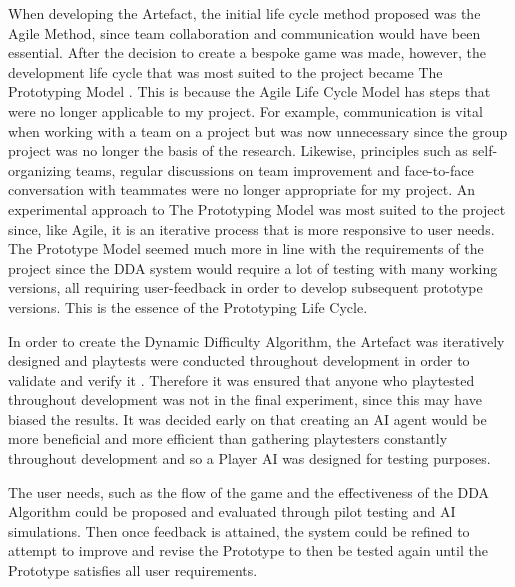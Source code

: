 \documentclass[journal]{IEEEtran}
\begin{document}
When developing the Artefact, the initial life cycle method proposed was the Agile Method, since team collaboration and communication would have been essential. After the decision to create a bespoke game was made, however, the development life cycle that was most suited to the project became The Prototyping Model \cite{isaias2015information}. This is because the Agile Life Cycle Model has steps that were no longer applicable to my project. For example, communication is vital when working with a team on a project but was now unnecessary since the group project was no longer the basis of the research. Likewise, principles such as self-organizing teams, regular discussions on team improvement and face-to-face conversation with teammates were no longer appropriate for my project. An experimental approach to The Prototyping Model was most suited to the project since, like Agile, it is an iterative process that is more responsive to user needs. The Prototype Model seemed much more in line with the requirements of the project since the DDA system would require a lot of testing with many working versions, all requiring user-feedback in order to develop subsequent prototype versions. This is the essence of the Prototyping Life Cycle.


In order to create the Dynamic Difficulty Algorithm, the Artefact was iteratively designed and playtests were conducted throughout development in order to validate and verify it \cite{fullerton2004game}. Therefore it was ensured that anyone who playtested throughout development was not in the final experiment, since this may have biased the results. It was decided early on that creating an AI agent would be more beneficial and more efficient than gathering playtesters constantly throughout development and so a Player AI was designed for testing purposes.

The user needs, such as the flow of the game and the effectiveness of the DDA Algorithm could be proposed and evaluated through pilot testing and AI simulations. Then once feedback is attained, the system could be refined to attempt to improve and revise the Prototype to then be tested again until the Prototype satisfies all user requirements.
\end{document}
